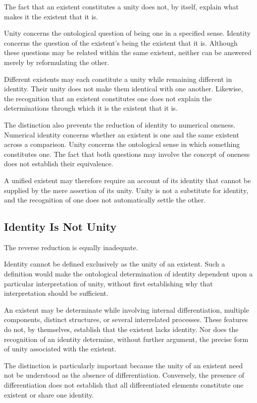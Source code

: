 The fact that an existent constitutes a unity does
not, by itself, explain what makes it the existent
that it is.

Unity concerns the ontological question of being one
in a specified sense. Identity concerns the question
of the existent's being the existent that it is.
Although these questions may be related within the
same existent, neither can be answered merely by
reformulating the other.

Different existents may each constitute a unity while
remaining different in identity. Their unity does not
make them identical with one another. Likewise, the
recognition that an existent constitutes one does not
explain the determinations through which it is the
existent that it is.

The distinction also prevents the reduction of identity
to numerical oneness. Numerical identity concerns
whether an existent is one and the same existent
across a comparison. Unity concerns the ontological
sense in which something constitutes one. The fact
that both questions may involve the concept of
oneness does not establish their equivalence.

A unified existent may therefore require an account
of its identity that cannot be supplied by the mere
assertion of its unity. Unity is not a substitute for
identity, and the recognition of one does not
automatically settle the other.

\subsection{Identity Is Not Unity}

The reverse reduction is equally inadequate.

Identity cannot be defined exclusively as the unity
of an existent. Such a definition would make the
ontological determination of identity dependent
upon a particular interpretation of unity, without
first establishing why that interpretation should
be sufficient.

An existent may be determinate while involving
internal differentiation, multiple components,
distinct structures, or several interrelated processes.
These features do not, by themselves, establish
that the existent lacks identity. Nor does the
recognition of an identity determine, without
further argument, the precise form of unity
associated with the existent.

The distinction is particularly important because
the unity of an existent need not be understood
as the absence of differentiation. Conversely,
the presence of differentiation does not establish
that all differentiated elements constitute one
existent or share one identity.

